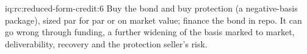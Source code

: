 \begin{solution}{iq:rc:reduced-form-credit:6}
Buy the bond and buy protection (a negative-basis package), sized par for par or on market
value; finance the bond in repo. It can go wrong through funding, a further widening of the
basis marked to market, deliverability, recovery and the protection seller's risk.
\end{solution}

